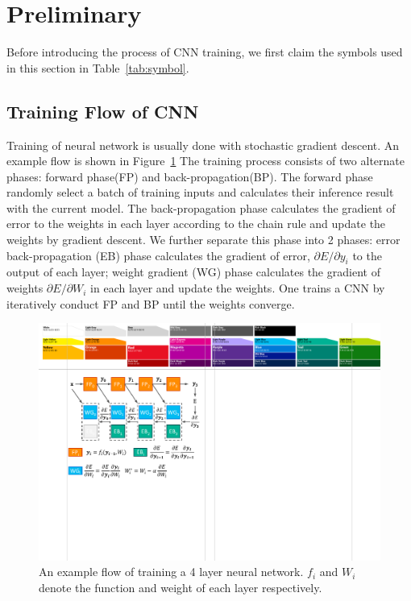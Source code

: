 \section{Preliminary}\label{sec:preliminary}
Before introducing the process of CNN training, we first claim the symbols used in this section in Table~\ref{tab:symbol}.



\subsection{Training Flow of CNN}
Training of neural network is usually done with stochastic gradient descent. An example flow is shown in Figure~\ref{fig:train_prelim} The training process consists of two alternate phases: forward phase(FP) and back-propagation(BP). The forward phase randomly select a batch of training inputs and calculates their inference result with the current model. The back-propagation phase calculates the gradient of error to the weights in each layer according to the chain rule and update the weights by gradient descent. We further separate this phase into 2 phases: error back-propagation (EB) phase calculates the gradient of error, $\partial E/\partial y_i$ to the output of each layer; weight gradient (WG) phase calculates the gradient of weights $\partial E/\partial W_i$ in each layer and update the weights. One trains a CNN by iteratively conduct FP and BP until the weights converge.

\begin{figure}[t]
  \centering
  \includegraphics[width=1\columnwidth]{figures/train_prelim.pdf}
  \caption{An example flow of training a 4 layer neural network. $f_i$ and $W_i$ denote the function and weight of each layer respectively.}
  \label{fig:train_prelim}
\end{figure}

